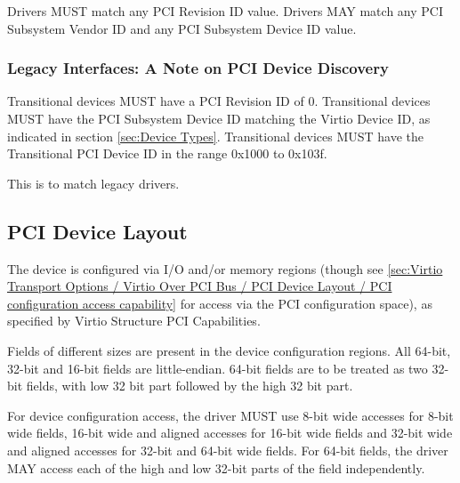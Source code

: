 Drivers MUST match any PCI Revision ID value.
Drivers MAY match any PCI Subsystem Vendor ID and any
PCI Subsystem Device ID value.

\subsubsection{Legacy Interfaces: A Note on PCI Device Discovery}\label{sec:Virtio Transport Options / Virtio Over PCI Bus / PCI Device Discovery / Legacy Interfaces: A Note on PCI Device Discovery}
Transitional devices MUST have a PCI Revision ID of 0.
Transitional devices MUST have the PCI Subsystem Device ID
matching the Virtio Device ID, as indicated in section \ref{sec:Device Types}.
Transitional devices MUST have the Transitional PCI Device ID in
the range 0x1000 to 0x103f.

This is to match legacy drivers.

\subsection{PCI Device Layout}\label{sec:Virtio Transport Options / Virtio Over PCI Bus / PCI Device Layout}

The device is configured via I/O and/or memory regions (though see
\ref{sec:Virtio Transport Options / Virtio Over PCI Bus / PCI Device Layout / PCI configuration access capability}
for access via the PCI configuration space), as specified by Virtio
Structure PCI Capabilities.

Fields of different sizes are present in the device
configuration regions.
All 64-bit, 32-bit and 16-bit fields are little-endian.
64-bit fields are to be treated as two 32-bit fields,
with low 32 bit part followed by the high 32 bit part.


For device configuration access, the driver MUST use 8-bit wide
accesses for 8-bit wide fields, 16-bit wide and aligned accesses
for 16-bit wide fields and 32-bit wide and aligned accesses for
32-bit and 64-bit wide fields. For 64-bit fields, the driver MAY
access each of the high and low 32-bit parts of the field
independently.


